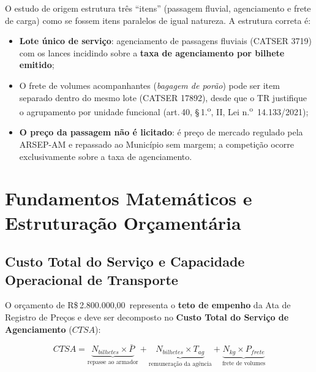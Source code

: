 \documentclass[12pt,a4paper]{article}
\newcommand{\art}[1]{art.\,#1}
\newcommand{\Rs}{R\$\,}
\newcommand{\valorTotal}{2.800.000,00}
\begin{document}
\begin{corrbox}
\small
O estudo de origem estrutura três ``itens'' (passagem fluvial, agenciamento e
frete de carga) como se fossem itens paralelos de igual natureza. A estrutura
correta é:
\begin{itemize}[topsep=2pt,itemsep=1pt]
  \item \textbf{Lote único de serviço}: agenciamento de passagens fluviais
    (CATSER 3719) com os lances incidindo sobre a \textbf{taxa de agenciamento
    por bilhete emitido};
  \item O frete de volumes acompanhantes (\textit{bagagem de porão}) pode
    ser item separado dentro do mesmo lote (CATSER 17892), desde que o TR
    justifique o agrupamento por unidade funcional (\art{40},
    \S\,1.\textsuperscript{o}, II, Lei n.\textsuperscript{o}~14.133/2021);
  \item \textbf{O preço da passagem não é licitado}: é preço de mercado
    regulado pela ARSEP-AM e repassado ao Município sem margem; a competição
    ocorre exclusivamente sobre a taxa de agenciamento.
\end{itemize}
\end{corrbox}

\section{Fundamentos Matemáticos e Estruturação Orçamentária}

\subsection{Custo Total do Serviço e Capacidade Operacional de Transporte}

O orçamento de \Rs \valorTotal\ representa o \textbf{teto de empenho} da Ata
de Registro de Preços e deve ser decomposto no \textbf{Custo Total do Serviço
de Agenciamento} ($CTSA$):

\begin{equation}
  CTSA = \underbrace{N_{bilhetes} \times \bar{P}}_{\text{repasse ao armador}}
       + \underbrace{N_{bilhetes} \times T_{ag}}_{\text{remuneração da agência}}
       + \underbrace{N_{kg} \times P_{frete}}_{\text{frete de volumes}}
  \label{eq:ctsa}
\end{equation}
\end{document}
